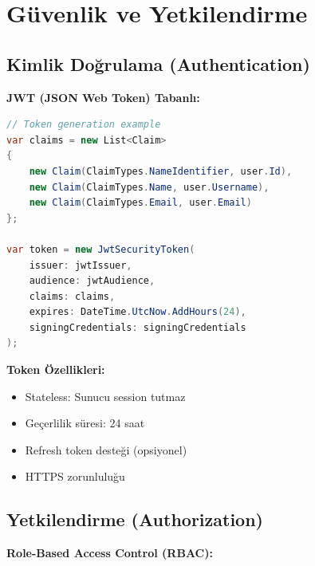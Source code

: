 \documentclass[12pt,a4paper]{article}
\begin{document}
\newpage

\section{Güvenlik ve Yetkilendirme}

\subsection{Kimlik Doğrulama (Authentication)}

\textbf{JWT (JSON Web Token) Tabanlı:}

\begin{lstlisting}[language=csharp]
// Token generation example
var claims = new List<Claim>
{
    new Claim(ClaimTypes.NameIdentifier, user.Id),
    new Claim(ClaimTypes.Name, user.Username),
    new Claim(ClaimTypes.Email, user.Email)
};

var token = new JwtSecurityToken(
    issuer: jwtIssuer,
    audience: jwtAudience,
    claims: claims,
    expires: DateTime.UtcNow.AddHours(24),
    signingCredentials: signingCredentials
);
\end{lstlisting}

\textbf{Token Özellikleri:}
\begin{itemize}
    \item Stateless: Sunucu session tutmaz
    \item Geçerlilik süresi: 24 saat
    \item Refresh token desteği (opsiyonel)
    \item HTTPS zorunluluğu
\end{itemize}

\subsection{Yetkilendirme (Authorization)}

\textbf{Role-Based Access Control (RBAC):}
\end{document}
